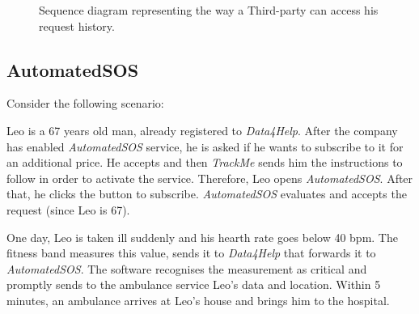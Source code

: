             \begin{figure}[H]
                \centering
                \caption{Sequence diagram representing the way a Third-party can access his request history.}
                \label{fig:D4H-Third-party-request-history}
            \end{figure}
            
            
    \subsection{AutomatedSOS}
        Consider the following scenario:
        
        Leo is a 67 years old man, already registered to \emph{Data4Help}. After the company has enabled \emph{AutomatedSOS} service, he is asked if he wants to subscribe to it for an additional price. He accepts and then \emph{TrackMe} sends him the instructions to follow in order to activate the service. Therefore, Leo opens \emph{AutomatedSOS}. After that, he clicks the button to subscribe. \emph{AutomatedSOS} evaluates and accepts the request (since Leo is 67).
        
        One day, Leo is taken ill suddenly and his hearth rate goes below 40 bpm. The fitness band measures this value, sends it to \emph{Data4Help} that forwards it to \emph{AutomatedSOS}. The software recognises the measurement as critical and promptly sends to the ambulance service Leo's data and location. Within 5 minutes, an ambulance arrives at Leo's house and brings him to the hospital.

